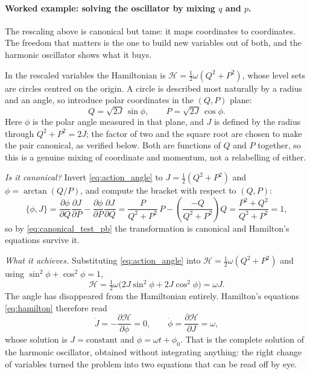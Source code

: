 \documentclass[12pt]{article}
\newcommand{\Ham}{\mathcal{H}}
\newcommand{\pb}[2]{\{#1,#2\}}
\begin{document}
\paragraph{Worked example: solving the oscillator by mixing $q$ and
$p$.}  The rescaling above is canonical but tame: it maps coordinates
to coordinates.  The freedom that matters is the one to build new
variables out of both, and the harmonic oscillator shows what it buys.

In the rescaled variables the Hamiltonian is
$\Ham = \tfrac12\omega(Q^2+P^2)$, whose level sets are circles centred
on the origin.  A circle is described most naturally by a radius and an
angle, so introduce polar coordinates in the $(Q,P)$ plane:
%
\begin{equation}
  Q = \sqrt{2J}\,\sin\phi ,
  \qquad
  P = \sqrt{2J}\,\cos\phi .
  \label{eq:action_angle}
\end{equation}
%
Here $\phi$ is the polar angle measured in that plane, and $J$ is
defined by the radius through $Q^2 + P^2 = 2J$; the factor of two and
the square root are chosen to make the pair canonical, as verified
below.  Both are functions of $Q$ and $P$ together, so this is a
genuine mixing of coordinate and momentum, not a relabelling of either.

\emph{Is it canonical?}  Invert \eqref{eq:action_angle} to
$J = \tfrac12(Q^2+P^2)$ and $\phi = \arctan(Q/P)$, and compute the
bracket with respect to $(Q,P)$:
%
\begin{equation}
  \pb{\phi}{J}
   = \frac{\partial\phi}{\partial Q}\frac{\partial J}{\partial P}
   - \frac{\partial\phi}{\partial P}\frac{\partial J}{\partial Q}
   = \frac{P}{Q^2+P^2}\,P
   - \left(\frac{-Q}{Q^2+P^2}\right) Q
   = \frac{P^2+Q^2}{Q^2+P^2} = 1 ,
\end{equation}
%
so by \eqref{eq:canonical_test_pb} the transformation is canonical and
Hamilton's equations survive it.

\emph{What it achieves.}  Substituting \eqref{eq:action_angle} into
$\Ham = \tfrac12\omega(Q^2+P^2)$ and using
$\sin^2\phi + \cos^2\phi = 1$,
%
\begin{equation}
  \Ham = \tfrac12\omega\bigl(2J\sin^2\phi + 2J\cos^2\phi\bigr)
       = \omega J .
  \label{eq:H_action_angle}
\end{equation}
%
The angle has disappeared from the Hamiltonian entirely.  Hamilton's
equations \eqref{eq:hamilton} therefore read
%
\begin{equation}
  \dot J = -\frac{\partial\Ham}{\partial\phi} = 0 ,
  \qquad
  \dot\phi = \frac{\partial\Ham}{\partial J} = \omega ,
\end{equation}
%
whose solution is $J = \text{constant}$ and $\phi = \omega t + \phi_0$.
That is the complete solution of the harmonic oscillator, obtained
without integrating anything: the right change of variables turned the
problem into two equations that can be read off by eye.
\end{document}
